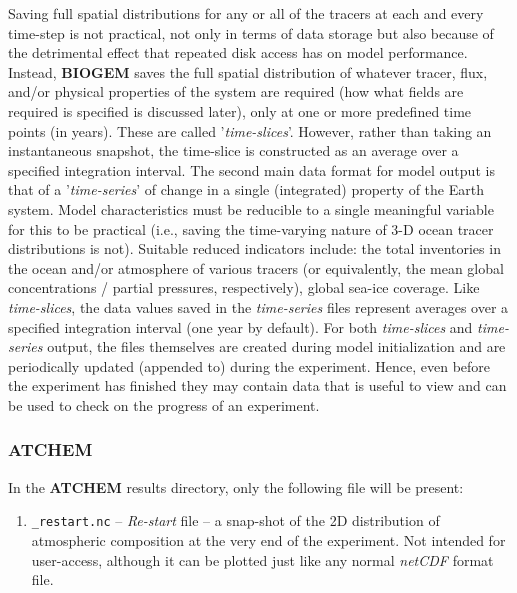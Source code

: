 \documentclass[11pt,fleqn]{book} %
\begin{document}
Saving full spatial distributions for any or all of the tracers at each and every time-step is not practical, not only in terms of data storage but also because of the detrimental effect that repeated disk access has on model performance. Instead, \textbf{BIOGEM} saves the full spatial distribution of whatever tracer, flux, and/or physical properties of the system are required (how what fields are required is specified is discussed later), only at one or more predefined time points (in years). These are called '\textit{time-slices}'. However, rather than taking an instantaneous snapshot, the time-slice is constructed as an average over a specified integration interval.
The second main data format for model output is that of a '\textit{time-series}' of change in a single (integrated) property of the Earth system. Model characteristics must be reducible to a single meaningful variable for this to be practical (i.e., saving the time-varying nature of 3-D ocean tracer distributions is not). Suitable reduced indicators include: the total inventories in the ocean and/or atmosphere of various tracers (or equivalently, the mean global concentrations / partial pressures, respectively), global sea-ice coverage. Like \textit{time-slices}, the data values saved in the \textit{time-series} files represent averages over a specified integration interval (one year by default). For both \textit{time-slices} and \textit{time-series} output, the files themselves are created during model initialization and are periodically updated (appended to) during the experiment. Hence, even before the experiment has finished they may contain data that is useful to view and can be used to check on the progress of an experiment.

\subsubsection{ATCHEM}

\noindent In the \textbf{ATCHEM} results directory, only the following file will be present:

\begin{enumerate}

\vspace{1mm}\item \texttt{\_restart.nc} -- \textit{Re-start} file -- a snap-shot of the 2D distribution of atmospheric composition at the very end of the experiment. Not intended for user-access, although it can be plotted just like any normal \textit{netCDF} format file.

\end{enumerate}\vspace{2mm}
\end{document}
